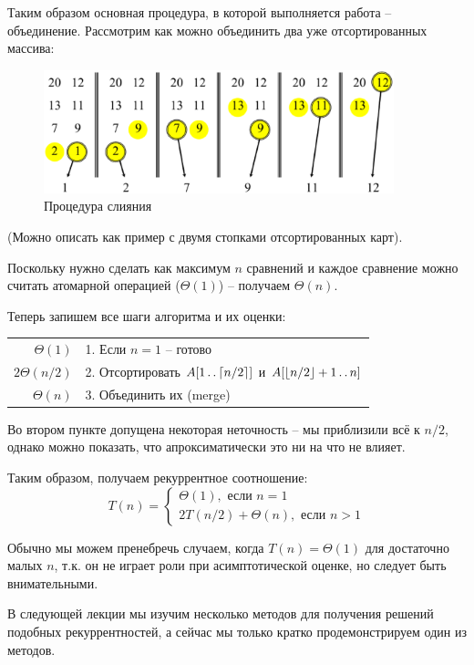 \documentclass[a4paper,11pt]{article}
\begin{document}
Таким образом основная процедура, в которой выполняется работа -- объединение.
Рассмотрим как можно объединить два уже отсортированных массива:

\begin{figure}[ht]
  \centering
  \includegraphics[width=4in]{lecture1/merge.eps}
  \caption{Процедура слияния}
  \label{fig:merge}
\end{figure}

(Можно описать как пример с двумя стопками отсортированных карт).

Поскольку нужно сделать как максимум $n$ сравнений и каждое сравнение можно
считать атомарной операцией ($\Theta(1)$) -- получаем $\Theta(n)$.

Теперь запишем все шаги алгоритма и их оценки:

\begin{tabular}{|r|l|}
$\Theta(1)$    & 1. Если $n = 1$ -- готово  \\
$2\Theta(n/2)$ & 2. Отсортировать $A[1 \mathinner{\ldotp\ldotp} \lceil n/2 \rceil]$ и $A[\lfloor
                    n/2 \rfloor+1 \mathinner{\ldotp\ldotp} n]$ \\
$\Theta(n)$    & 3. Объединить их (merge) 
\end{tabular}

Во втором пункте допущена некоторая неточность -- мы приблизили всё к $n/2$,
однако можно показать, что апроксиматически это ни на что не влияет.

Таким образом, получаем рекуррентное соотношение:
\begin{equation}
  T(n) = \begin{cases}
    \Theta(1), \text{ если } n = 1 \\
    2T(n/2) + \Theta(n), \text{ если } n > 1
    \end{cases}
  \label{eq:recur}
\end{equation}

Обычно мы можем пренебречь случаем, когда $T(n) = \Theta(1)$ для достаточно
малых $n$, т.к. он не играет роли при асимптотической оценке, но следует быть
внимательными.

В следующей лекции мы изучим несколько методов для получения решений подобных
рекуррентностей, а сейчас мы только кратко продемонстрируем один из методов.
\end{document}
